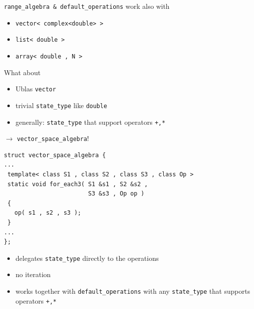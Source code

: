 \begin{frame}[fragile]
 \lstinline+range_algebra & default_operations+ work also with

\begin{itemize}
 \item \lstinline+vector< complex<double> >+
 \item \lstinline+list< double >+
 \item \lstinline+array< double , N >+
\end{itemize}

\pause
What about
\begin{itemize}
 \item Ublas \lstinline+vector+
 \item trivial \lstinline+state_type+ like \lstinline+double+
 \item generally: \lstinline+state_type+ that support operators \lstinline!+,*!
\end{itemize}

\vspace{1em}
\centerline{$\longrightarrow$ \lstinline+vector_space_algebra+!}

\end{frame}


\begin{frame}[fragile]

\begin{lstlisting}
struct vector_space_algebra {
...
 template< class S1 , class S2 , class S3 , class Op >
 static void for_each3( S1 &s1 , S2 &s2 , 
                        S3 &s3 , Op op )
 {
   op( s1 , s2 , s3 );
 }
...
};
\end{lstlisting}

\begin{itemize}
 \item delegates \lstinline+state_type+ directly to the operations 
 \item no iteration
 \item works together with \lstinline+default_operations+ with any \lstinline+state_type+ that supports operators \lstinline!+,*!
\end{itemize}

\end{frame}


